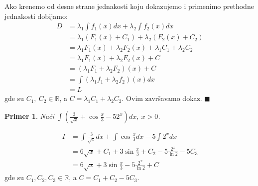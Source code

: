 \documentclass{article}
\newtheorem{prim}{Primer}[section]
\begin{document}
Ako krenemo od desne strane jednakosti koju dokazujemo i
primenimo prethodne jednakosti dobijamo:
\begin{align*}
    D & = \lambda_1\int f_1(x) dx + \lambda_2\int f_2(x) dx \\ &=
    \lambda_1(F_1(x) + C_1) + \lambda_2(F_2(x) + C_2)       \\ &=
    \lambda_1  F_1(x) + \lambda_2  F_2(x) +
    \lambda_1  C_1 + \lambda_2  C_2                         \\ &=
    \lambda_1  F_1(x) + \lambda_2  F_2(x) + C               \\ &=
    (\lambda_1 F_1 + \lambda_2 F_2)(x) + C                  \\ &=
    \int (\lambda_1 f_1+ \lambda_2 f_2)(x)dx                \\ &=
    L
\end{align*}
gde su $C_1,\ C_2\in\mathbb{R}$, a $C=\lambda_1C_1+\lambda_2C_2$. Ovim završavamo dokaz.
\null\hfill $\blacksquare$ \par
\begin{primbox}
    \begin{prim}
        Naći $\int (\frac{3}{\sqrt{x}} +
            \cos\frac{x}{3} - 52^x)dx,\ x > 0$.
    \end{prim}
    \begin{align*}
        I & = \int\frac{3}{\sqrt{x}} dx + \int \cos\frac{x}{3} dx - 5\int 2^x dx
        \\ & = 6\sqrt{x} + C_1 + 3\sin\frac{x}{3} + C_2 - 5\frac{2^x}{\ln{2}} - 5C_3
        \\ & = 6\sqrt{x} + 3\sin\frac{x}{3} - 5\frac{2^x}{\ln{2}} + C
    \end{align*}
    gde su $C_1,C_2,C_3\in\mathbb{R}$, a $C=C_1+C_2-5C_3$.
\end{primbox}
\end{document}

